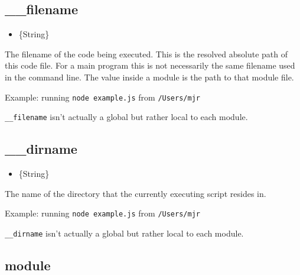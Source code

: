 \subsection{\_\_filename}

\begin{itemize}
\item
  \{String\}
\end{itemize}

The filename of the code being executed. This is the resolved absolute
path of this code file. For a main program this is not necessarily the
same filename used in the command line. The value inside a module is the
path to that module file.

Example: running \texttt{node example.js} from \texttt{/Users/mjr}

\begin{Shaded}
\begin{Highlighting}[]
\end{Highlighting}
\end{Shaded}

\texttt{\_\_filename} isn't actually a global but rather local to each
module.

\subsection{\_\_dirname}

\begin{itemize}
\item
  \{String\}
\end{itemize}

The name of the directory that the currently executing script resides
in.

Example: running \texttt{node example.js} from \texttt{/Users/mjr}

\begin{Shaded}
\begin{Highlighting}[]
\end{Highlighting}
\end{Shaded}

\texttt{\_\_dirname} isn't actually a global but rather local to each
module.

\subsection{module}

